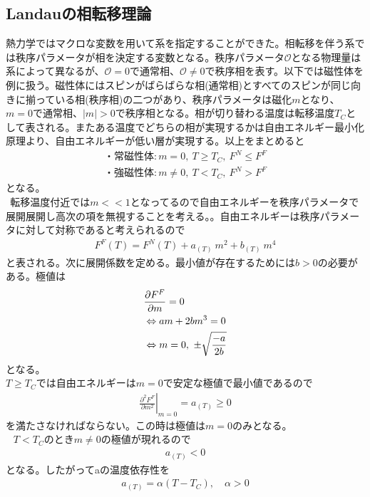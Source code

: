 \documentclass[dvipdfmx, 11pt, a4paper]{jsarticle}
\numberwithin{equation}{section}
\theoremstyle{definition}
\begin{document}
\subsection{Landauの相転移理論}
    熱力学ではマクロな変数を用いて系を指定することができた。相転移を伴う系では秩序パラメータが相を決定する変数となる。秩序パラメータ$\mathcal{O}$となる物理量は系によって異なるが、$\mathcal{O} = 0$で通常相、$\mathcal{O} \ne 0$で秩序相を表す。以下では磁性体を例に扱う。磁性体にはスピンがばらばらな相(通常相)とすべてのスピンが同じ向きに揃っている相(秩序相)の二つがあり、秩序パラメータは磁化$m$となり、$m=0$で通常相、$|m|>0$で秩序相となる。相が切り替わる温度は転移温度$T_C$として表される。またある温度でどちらの相が実現するかは自由エネルギー最小化原理より、自由エネルギーが低い層が実現する。以上をまとめると
    \begin{align}
        \text{・常磁性体}:m=0,\ T\ge T_C,\ F^N \le F^F\\
        \text{・強磁性体}:m\ne 0,\ T < T_C,\ F^N>F^F
    \end{align}
    となる。\\
    $\ \ $転移温度付近では$m<<1$となってるので自由エネルギーを秩序パラメータで展開展開し高次の項を無視することを考える。。自由エネルギーは秩序パラメータに対して対称であると考えられるので
    \begin{align}
        F^F(T) = F^N(T) + a_{(T)}\ m^2 + b_{(T)}\ m^4
    \end{align}
    と表される。次に展開係数を定める。最小値が存在するためには$b>0$の必要がある。極値は
    \begin{align}
        &\frac{\partial F^F}{\partial m} = 0\notag \\
        &\Leftrightarrow am + 2bm^3 = 0 \notag \\
        &\Leftrightarrow m = 0,\ \pm \sqrt{\frac{-a}{2b}}
    \end{align}
    となる。\\
    $T \ge T_C$では自由エネルギーは$m=0$で安定な極値で最小値であるので
    \begin{align}
        \left. \frac{\partial^2F^F}{\partial m^2} \right|_{m=0} = a_{(T)}  \ge 0
    \end{align}
    を満たさなければならない。この時は極値は$m=0$のみとなる。\\
    $\ \ $ $T < T_C$のとき$m\ne0$の極値が現れるので
    \begin{align}
        a_{(T)} < 0
    \end{align}
    となる。したがってaの温度依存性を
    \begin{align}
        a_{(T)} = \alpha (T-T_C),\quad \alpha > 0
    \end{align}
\end{document}
